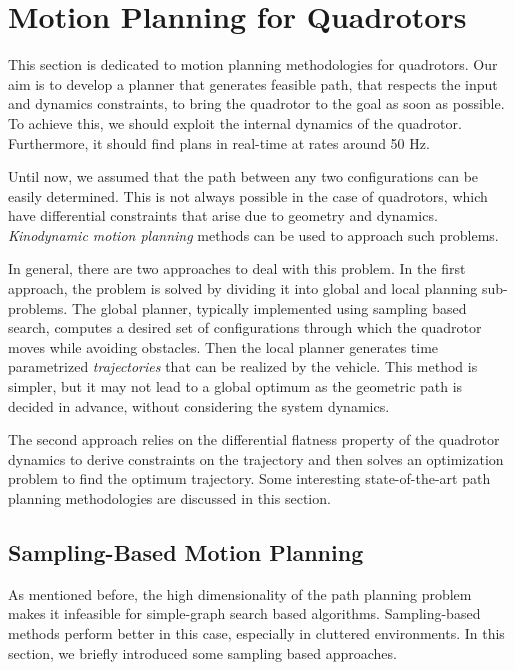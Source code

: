 \section{Motion Planning for Quadrotors}
\label{sec:planning_quadrotors}
This section is dedicated to motion planning methodologies for quadrotors. 
Our aim is to develop a planner that generates feasible path, that respects the input and dynamics constraints, to bring the quadrotor to the goal as soon as possible. To achieve this, we should exploit the internal dynamics of the quadrotor. Furthermore, it should find plans in real-time at rates around 50 Hz. 

Until now, we assumed that the path between any two configurations can be easily determined. This is not always possible in the case of quadrotors, which have differential constraints that arise due to geometry and dynamics. \textit{Kinodynamic motion planning} \cite{donald1993kinodynamic} methods can be used to approach such problems. 

In general, there are two approaches to deal with this problem. In the first approach, the problem is solved by dividing it into global and local planning sub-problems. The global planner, typically implemented using sampling based search, computes a desired set of configurations through which the quadrotor moves while avoiding obstacles. Then the local planner generates time parametrized \textit{trajectories} that can be realized by the vehicle. This method is simpler, but it may not lead to a global optimum as the geometric path is decided in advance, without considering the system dynamics. 

The second approach relies on the differential flatness \cite{mellinger2011minimum} property of the quadrotor dynamics to derive constraints on the trajectory and then solves an optimization problem to find the optimum trajectory. Some interesting state-of-the-art path planning methodologies are discussed in this section. 

\subsection{Sampling-Based Motion Planning}
\label{sec:sampling_planning}
As mentioned before, the high dimensionality of the path planning problem makes it infeasible for simple-graph search based algorithms. Sampling-based methods perform better in this case, especially in cluttered environments. In this section, we briefly introduced some sampling based approaches. 

